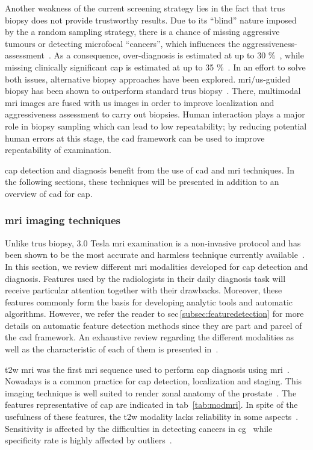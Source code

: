 Another weakness of the current screening strategy lies in the fact that \ac{trus} biopsy does not provide trustworthy results. Due to its ``blind'' nature imposed by the a random sampling strategy, there is a chance of missing aggressive tumours or detecting microfocal ``cancers'', which influences the aggressiveness-assessment~\cite{Noguchi2001}. As a consequence, over-diagnosis is estimated at up to 30 \%~\cite{Haas2007}, while missing clinically significant \ac{cap} is estimated at up to 35 \%~\cite{Taira2010}. In an effort to solve both issues, alternative biopsy approaches have been explored. \ac{mri}/\ac{us}-guided biopsy has been shown to outperform standard \ac{trus} biopsy~\cite{Delongchamps2013}. There, multimodal \ac{mri} images are fused with \ac{us} images in order to improve localization and aggressiveness assessment to carry out biopsies. Human interaction plays a major role in biopsy sampling which can lead to low repeatability; by reducing potential human errors at this stage, the \acs{cad} framework can be used to improve repeatability of examination.

\ac{cap} detection and diagnosis benefit from the use of \acs{cad} and \ac{mri} techniques. In the following sections, these techniques will be presented in addition to an overview of \acs{cad} for \ac{cap}.

\subsubsection{\ac{mri} imaging techniques}\label{subsubsec:mrimrsi}
Unlike \ac{trus} biopsy, 3.0 Tesla \ac{mri} examination is a non-invasive protocol and has been shown to be the most accurate and harmless technique currently available~\cite{Turkbey2012}. In this section, we review different \ac{mri} modalities developed for \ac{cap} detection and diagnosis. Features used by the radiologists in their daily diagnosis task will receive particular attention together with their drawbacks. Moreover, these features commonly form the basis for developing analytic tools and automatic algorithms. However, we refer the reader to \acs{sec}\,\ref{subsec:featuredetection} for more details on automatic feature detection methods since they are part and parcel of the \acs{cad} framework. An exhaustive review regarding the different modalities as well as the characteristic of each of them is presented in~\cite{Barentsz2012}.

\ac{t2w} \ac{mri} was the first \ac{mri} sequence used to perform \ac{cap} diagnosis using \ac{mri}~\cite{Hricak1983}. Nowadays is a common practice for \ac{cap} detection, localization and staging. This imaging technique is well suited to render zonal anatomy of the prostate~\cite{Barentsz2012}. The features representative of \ac{cap} are indicated in \acs{tab}~\ref{tab:modmri}. In spite of the usefulness of these features, the \ac{t2w} modality lacks reliability in some aspects~\cite{Kirkham2006,Hoeks2011}. Sensitivity is affected by the difficulties in detecting cancers in \ac{cg}~\cite{Kirkham2006} while specificity rate is highly affected by outliers~\cite{Hricak1987,Quint1991,Scheidler1999,Cruz2002,Barentsz2012}.

